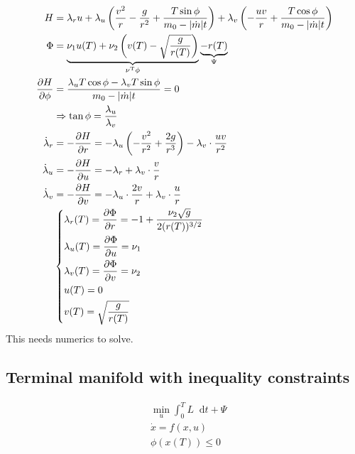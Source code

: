 \documentclass[letterpaper,12pt,titlepage]{report}
\newcommand*\dif{\mathop{}\!\mathrm{d}}
\newcommand{\trans}{^\text{T}}
\newcommand*\pder[2]{\frac{\partial #1}{\partial #2}}
\theoremstyle{plain}
\theoremstyle{definition}
\begin{document}
\begin{align}
  H &= \lambda_r u + \lambda_u \left( \frac{v^2}{r} - \frac{g}{r^2} + \frac{T\sin\phi}{m_0-|\dot m|t} \right) + \lambda_v \left(-\frac{uv}{r} + \frac{T\cos\phi}{m_0-|\dot m|t} \right) \\
  \Phi &= \underbrace{\nu_1 u(T) + \nu_2 \left(v(T) - \sqrt{\frac{g}{r(T)}}\right)}_{\nu\trans\phi} \underbrace{- r(T)}_{\Psi} \\
  \pder{H}{\phi} &= \frac{\lambda_u T\cos\phi - \lambda_v T\sin\phi}{m_0 - |\dot m|t} = 0 \\
    & \Rightarrow \tan\phi = \frac{\lambda_u}{\lambda_v} \\
  \dot\lambda_r &= -\pder{H}{r} = -\lambda_u \left(-\frac{v^2}{r^2} + \frac{2g}{r^3}\right) - \lambda_v\cdot\frac{uv}{r^2} \\
  \dot\lambda_u &= -\pder{H}{u} = -\lambda_r + \lambda_v\cdot \frac{v}{r} \\
  \dot\lambda_v &= -\pder{H}{v} = -\lambda_u\cdot \frac{2v}{r} + \lambda_v\cdot \frac{u}{r} \\
    & \begin{dcases}
      \lambda_r(T) = \pder{\Phi}{r} = -1 + \frac{\nu_2\sqrt{g}}{2(r(T))^{3/2}} \\
      \lambda_u(T) = \pder{\Phi}{u} = \nu_1 \\
      \lambda_v(T) = \pder{\Phi}{v} = \nu_2 \\
      u(T) = 0 \\
      v(T) = \sqrt{\frac{g}{r(T)}}
    \end{dcases}
\end{align}
This needs numerics to solve.

\subsection{Terminal manifold with inequality constraints}
\begin{align}
  & \min_u \int_0^T L\dif t + \Psi \\
  & \dot x = f(x,u) \\
  & \phi(x(T)) \le 0
\end{align}

\begin{center}
\end{center}
\end{document}
